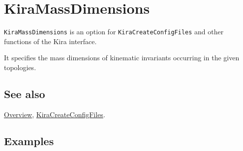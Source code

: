 \documentclass[../FeynHelpersManual.tex]{subfiles}
\begin{document}
\begin{Shaded}
\begin{Highlighting}[]
 
\end{Highlighting}
\end{Shaded}

\hypertarget{kiramassdimensions}{
\section{KiraMassDimensions}\label{kiramassdimensions}}

\texttt{KiraMassDimensions} is an option for
\texttt{KiraCreateConfigFiles} and other functions of the Kira
interface.

It specifies the mass dimensions of kinematic invariants occurring in
the given topologies.

\subsection{See also}

\hyperlink{toc}{Overview},
\hyperlink{kiracreateconfigfiles}{KiraCreateConfigFiles}.

\subsection{Examples}
\end{document}
